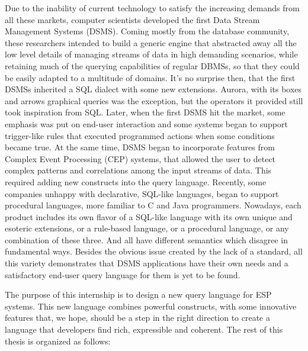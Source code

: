 \documentclass[twoside]{report}
\begin{document}
Due to the inability of current technology to satisfy the increasing demands from all these markets, computer scientists developed the first Data Stream Management Systems (DSMS). Coming mostly from the database community, these researchers intended to build a generic engine that abstracted away all the low level details of managing streams of data in high demanding scenarios, while retaining much of the querying capabilities of regular DBMSs, so that they could be easily adapted to a multitude of domains. It's no surprise then, that the first DSMSs inherited a SQL dialect with some new extensions. Aurora, with its boxes and arrows graphical queries was the exception, but the operators it provided still took inspiration from SQL. Later, when the first DSMS hit the market, some emphasis was put on end-user interaction and some systems began to support trigger-like rules that executed programmed actions when some conditions became true. At the same time, DSMS began to incorporate features from Complex Event Processing (CEP) systems, that allowed the user to detect complex patterns and correlations among the input streams of data. This required adding new constructs into the query language. Recently, some companies unhappy with declarative, SQL-like languages, began to support procedural languages, more familiar to C and Java programmers. Nowadays, each product includes its own flavor of a SQL-like language with its own unique and esoteric extensions, or a rule-based language, or a procedural language, or any combination of these three. And all have different semantics which disagree in fundamental ways. Besides the obvious issue created by the lack of a standard, all this variety demonstrates that DSMS applications have their own needs and a satisfactory end-user query language for them is yet to be found.

The purpose of this internship is to design a new query language for ESP systems. This new language combines powerful constructs, with some innovative features that, we hope, should be a step in the right direction to create a language that developers find rich, expressible and coherent. The rest of this thesis is organized as follows:
\end{document}
